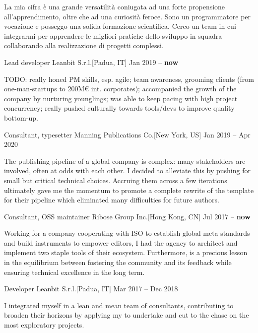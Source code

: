 \documentclass[9pt]{scrartcl}
\def\Phi{1.618}
\newlength{\Pad}\setlength{\Pad}{14.562pt} %
\begin{document}


La mia cifra è una grande versatilità coniugata ad una forte propensione
all'apprendimento, oltre che ad una curiosità feroce. Sono un programmatore per
vocazione e posseggo una solida formazione scientifica. Cerco un team in cui
integrarmi per apprendere le migliori pratiche dello sviluppo in squadra
collaborando alla realizzazione di progetti complessi.


\Event
  {Lead developer}
  {Leanbit S.r.l.}[Padua, IT]
  {Jan 2019 -- \textbf{now}}

TODO: really honed PM skills, esp. agile; team awareness, grooming clients (from
one-man-startups to 200M€ int. corporates); accompanied the growth of the
company by nurturing younglings; was able to keep pacing with high project
concurrency; really pushed culturally towards tools/devs to improve quality
bottom-up.

\smallskip

\Event
  {Consultant, typesetter}
  {Manning Publications Co.}[New York, US]
  {Jan 2019 -- Apr 2020}

The publishing pipeline of a global company is complex: many stakeholders are
involved, often at odds with each other. I decided to alleviate this by pushing
for small but critical technical choices. Accruing them across a few iterations
ultimately gave me the momentum to promote a complete rewrite of the template for their
 pipeline which eliminated many difficulties for future authors.

\smallskip

\Event
  {Consultant, OSS maintainer}
  {Ribose Group Inc.}[Hong Kong, CN]
  {Jul 2017 -- \textbf{now}}

Working for a company cooperating with ISO to establish global meta-standards
and build instruments to empower editors, I had the agency to architect and
implement two staple  tools of their ecosystem. Furthermore,
 is a precious lesson in the equilibrium between
fostering the community and its feedback while ensuring technical excellence in
the long term.

\smallskip

\Event
  {Developer}
  {Leanbit S.r.l.}[Padua, IT]
  {Mar 2017 -- Dec 2018}

I integrated myself in a lean and mean team of consultants, contributing to
broaden their horizons by applying my  to undertake and cut
to the chase on the most exploratory projects.
\end{document}
